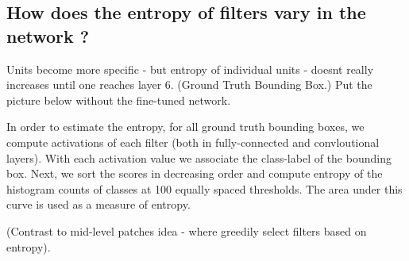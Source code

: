 \documentclass[runningheads]{llncs}
\begin{document}
\subsection{How does the entropy of filters vary in the network ?}
Units become more specific - but entropy of individual units - doesnt really increases until one reaches layer 6. (Ground Truth Bounding Box.) Put the picture below without the fine-tuned network.


In order to estimate the entropy, for all ground truth bounding boxes, we compute activations of each filter (both in fully-connected and convloutional layers). With each activation value we associate the class-label of the bounding box. Next, we sort the scores in decreasing order and compute entropy of the histogram counts of classes at 100 equally spaced thresholds. The area under this curve is used as a measure of entropy. 

(Contrast to mid-level patches idea - where greedily select filters based on entropy). 
\end{document}

